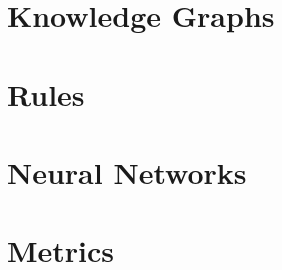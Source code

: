 \section{Knowledge Graphs}
\label{sec:3_basics/1_knowledge_graphs}



\section{Rules}
\label{sec:3_basics/2_rules}



\section{Neural Networks}
\label{sec:3_basics/3_neural_networks}



\section{Metrics}
\label{sec:3_basics/4_metrics}

